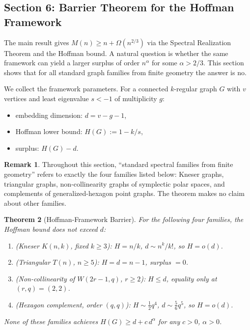 \documentclass{article}
\newtheorem{theorem}{Theorem}[section]
\theoremstyle{definition}
\newtheorem{remark}[theorem]{Remark}
\begin{document}
\subsection*{Section 6: Barrier Theorem for the Hoffman Framework}

The main result gives $M(n)\ge n+\Omega(n^{2/3})$ via the Spectral Realization Theorem and the Hoffman bound.  A natural question is whether the same framework can yield a larger surplus of order $n^\alpha$ for some $\alpha>2/3$.  This section shows that for all standard graph families from finite geometry the answer is no.

\medskip
We collect the framework parameters.  For a connected $k$-regular graph $G$ with $v$ vertices and least eigenvalue $s<-1$ of multiplicity $g$:
\begin{itemize}
  \item embedding dimension: $d = v - g - 1$,
  \item Hoffman lower bound: $H(G) := 1 - k/s$,
  \item surplus: $H(G) - d$.
\end{itemize}

\begin{remark}
Throughout this section, ``standard spectral families from finite geometry'' refers to exactly the four families listed below: Kneser graphs, triangular graphs, non-collinearity graphs of symplectic polar spaces, and complements of generalized-hexagon point graphs.  The theorem makes no claim about other families.
\end{remark}

\begin{theorem}[Hoffman-Framework Barrier]\label{thm:barrier}
For the following four families, the Hoffman bound does not exceed $d$:
\begin{enumerate}
  \item \textup{(Kneser $K(n,k)$, fixed $k\ge 3$):} $H = n/k$, $d\sim n^k/k!$, so $H = o(d)$.
  \item \textup{(Triangular $T(n)$, $n\ge 5$):} $H = d = n-1$, surplus $= 0$.
  \item \textup{(Non-collinearity of $W(2r{-}1,q)$, $r\ge 2$):} $H\le d$, equality only at $(r,q)=(2,2)$.
  \item \textup{(Hexagon complement, order $(q,q)$):} $H\sim\tfrac12q^4$, $d\sim\tfrac56q^5$, so $H = o(d)$.
\end{enumerate}
None of these families achieves $H(G)\ge d+c\,d^\alpha$ for any $c>0$, $\alpha>0$.
\end{theorem}
\end{document}
